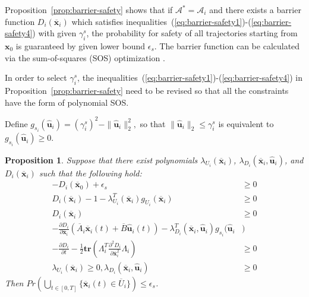 \documentclass[journal]{IEEEtran}
\newtheorem{proposition}{Proposition}
\begin{document}
Proposition~\ref{prop:barrier-safety} shows that if $\mathcal{A}^{\ast} = \mathcal{A}_i$ and there exists a barrier function $D_i(\overline{\mathbf{x}}_i)$ which satisfies inequalities~(\ref{eq:barrier-safety1})-(\ref{eq:barrier-safety4}) with given $\gamma^s_i$, the probability for safety of all trajectories starting from $\mathbf{x}_0$ is guaranteed by given lower bound $\epsilon_s$. The barrier function can be calculated via the sum-of-squares (SOS) optimization \cite{prajna2002introducing}. 

In order to select $\gamma^s_i$, the inequalities~(\ref{eq:barrier-safety1})-(\ref{eq:barrier-safety4}) in Proposition~\ref{prop:barrier-safety} need to be revised so that all the constraints have the form of polynomial SOS.

Define $g_{s_i}(\hat{\mathbf{u}}_i) = (\gamma^s_i)^{2}-\|\hat{\mathbf{u}}_i\|_{2}^{2},$
so that $\|\hat{\mathbf{u}}_i\|_{2} \leq \gamma^s_i$ is equivalent to $g_{s_i}(\hat{\mathbf{u}}_i) \geq 0$.

\begin{proposition}
\label{prop:barrier-safety-sos}
Suppose that there exist polynomials $\lambda_{U_i}(\overline{\mathbf{x}}_i)$, $\lambda_{D_i}(\overline{\mathbf{x}}_i, \hat{\mathbf{u}}_i)$, and $D_i(\overline{\mathbf{x}}_i)$ such that the following hold:
\begin{align}
\label{eq:barrier-safety-sos1}
-D_i(\overline{\mathbf{x}}_{0}) + \epsilon_s &\geq 0 \\
\label{eq:barrier-safety-sos2}
D_i(\overline{\mathbf{x}}_i) - 1 - \lambda_{U_i}^{T}(\overline{\mathbf{x}}_i)g_{U_i}(\overline{\mathbf{x}}_i) &\geq 0 \\
\label{eq:barrier-safety-sos3}
D_i(\overline{\mathbf{x}}_i) &\geq 0 \\
\nonumber
-\frac{\partial D_i}{\partial \overline{\mathbf{x}}_i}(\overline{A}_i\overline{\mathbf{x}}_i(t) + \overline{B}\hat{\mathbf{u}}_i(t)) - \lambda_{D_i}^{T}(\overline{\mathbf{x}}_i,\hat{\mathbf{u}}_i)g_{s_i}(\hat{\mathbf{u}}_i&) \\
\label{eq:barrier-safety-sos4}
 - \frac{\partial D_i}{\partial t} - \frac{1}{2}\mathbf{tr}(\Lambda_i^{T}\frac{\partial^{2}D_i}{\partial \overline{\mathbf{x}}_i^{2}}\Lambda_i) &\geq 0 \\
\label{eq:barrier-safety-sos5}
\lambda_{U_i}(\overline{\mathbf{x}}_i) \geq 0, \lambda_{D_i}(\overline{\mathbf{x}}_i,\hat{\mathbf{u}}_i) &\geq 0
\end{align}
Then $Pr\left(\bigcup_{t \in [0,T]}{\{\overline{\mathbf{x}}_i(t) \in \overline{U}_i\}}\right) \leq \epsilon_s$.
\end{proposition}
\end{document}
